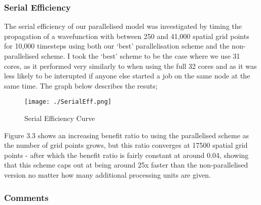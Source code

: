\subsubsection{Serial Efficiency}
The serial efficiency of our parallelised model was investigated by timing the propagation of a wavefunction with between 250 and 41,000 spatial grid points for 10,000 timesteps using both our `best' parallelisation scheme and the non-parallelised scheme. I took the `best' scheme to be the case where we use 31 cores, as it performed very similarly to when using the full 32 cores and as it was less likely to be interupted if anyone else started a job on the same node at the same time. The graph below describes the resuts;

\begin{figure}[H]
         \texttt{[image: ./SerialEff.png]}
         \centering
         \caption{Serial Efficiency Curve}
\end{figure}


Figure 3.3 shows an increasing benefit ratio to using the parallelised scheme as the number of grid points grows, but this ratio converges at 17500 spatial grid points - after which the benefit ratio is fairly constant at around 0.04, showing that this scheme caps out at being around 25x faster than the non-parallelised version no matter how many additional processing units are given.

\subsubsection{Comments}


